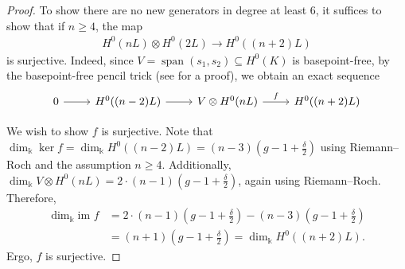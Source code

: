 \documentclass{amsart}
\theoremstyle{plain}
\theoremstyle{definition}
\theoremstyle{remark}
\newtheorem{rem}[thm]{Remark}
\numberwithin{equation}{section}
\newcommand\Bk{{\Bbbk}}
\newcommand\im{\text{im }}
\DeclareMathOperator{\newspan}{span}
\begin{document}

\begin{proof}
To show there are no new generators in degree at least $6$, it
suffices to show that if $n \geq 4$, the map
\begin{align*}
	H^0(nL) \otimes H^0(2L) \rightarrow H^0((n+2)L)
\end{align*}
is surjective. Indeed, since $V = \newspan(s_1, s_2) \subseteq
H^0(K)$ is basepoint-free, by the basepoint-free pencil trick (see
\cite[Lemma 2.6]{saint-donat:proj} for a proof), we obtain an exact
sequence
$$\begin{tikzcd}
0 \ar r & H^0((n-2)L) \ar r & V \otimes H^0(nL) \ar{r}{f} & H^0((n+2)L)
\end{tikzcd}$$

We wish to show $f$ is surjective.
Note that $\dim_\Bk \ker f = \dim_\Bk H^0((n - 2)L) = (n - 3)(g - 1+\frac{\delta}{2})$ using Riemann--Roch and the assumption $n \geq 4.$
Additionally, $\dim_\Bk V \otimes H^0(nL) = 2 \cdot (n - 1)(g - 1+\frac{\delta}{2})$, again using Riemann--Roch.
Therefore,
\begin{align*}
	\dim_\Bk \im f 	& = 2 \cdot (n - 1)(g - 1+ \frac{\delta}{2}) - (n - 3)(g - 1 + \frac{\delta}{2})\\
				& = (n + 1)(g - 1 + \frac{\delta}{2}) = \dim_\Bk H^0((n + 2)L).
\end{align*}
Ergo, $f$ is surjective.
\end{proof}
\end{document}
